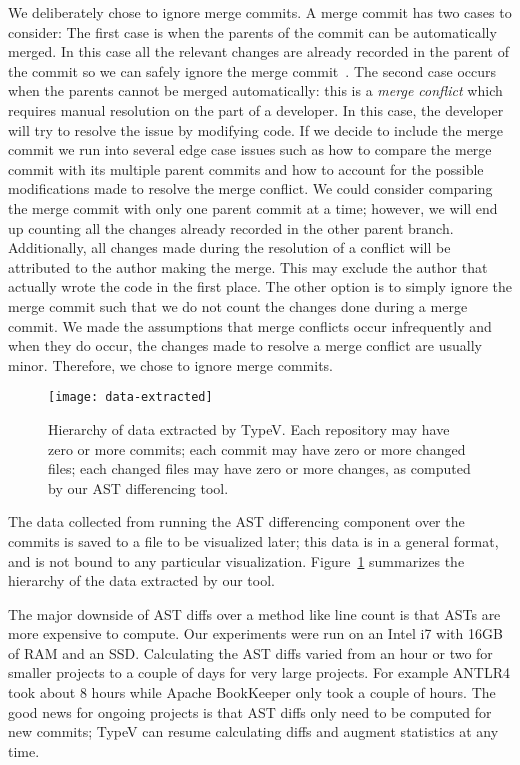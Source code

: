 We deliberately chose to ignore merge commits. A merge commit has two cases to consider: The first case is when the parents of the commit can be automatically merged. In this case all the relevant changes are already recorded in the parent of the commit so we can safely ignore the merge commit~\cite{git:merge}. The second case occurs when the parents cannot be merged automatically: this is a \emph{merge conflict} which requires manual resolution on the part of a developer. In this case, the developer will try to resolve the issue by modifying code. If we decide to include the merge commit we run into several edge case issues such as how to compare the merge commit with its multiple parent commits and how to account for the possible modifications made to resolve the merge conflict. We could consider comparing the merge commit with only one parent commit at a time; however, we will end up counting all the changes already recorded in the other parent branch. Additionally, all changes made during the resolution of a conflict will be attributed to the author making the merge. This may exclude the author that actually wrote the code in the first place. The other option is to simply ignore the merge commit such that we do not count the changes done during a merge commit. We made the assumptions that merge conflicts occur infrequently and when they do occur, the changes made to resolve a merge conflict are usually minor. Therefore, we chose to ignore merge commits. 

\begin{figure}[tb]
\centering
\texttt{[image: data-extracted]}
\caption{Hierarchy of data extracted by TypeV. Each repository may have zero or more commits; each commit may have zero or more changed files; each changed files may have zero or more changes, as computed by our AST differencing tool.}
\label{fig:data-extracted}
\end{figure}

The data collected from running the AST differencing component over the commits is saved to a file to be visualized later; this data is in a general format, and is not bound to any particular visualization. Figure~\ref{fig:data-extracted} summarizes the hierarchy of the data extracted by our tool.

The major downside of AST diffs over a method like line count is that ASTs are more expensive to compute. Our experiments were run on an Intel i7 with 16GB of RAM and an SSD. Calculating the AST diffs varied from an hour or two for smaller projects to a couple of days for very large projects. For example ANTLR4 took about 8 hours while Apache BookKeeper only took a couple of hours. The good news for ongoing projects is that AST diffs only need to be computed for new commits; TypeV can resume calculating diffs and augment statistics at any time.

